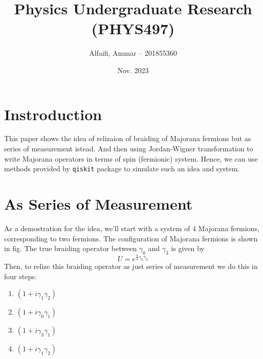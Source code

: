 \documentclass{article}
\title{Physics Undergraduate Research (PHYS497)}
\author{Alfaifi, Ammar -- 201855360}
\date{Nov. 2023}
\def\c#1{\texttt{#1}}
\begin{document}
\maketitle

\section{Instroduction} %
\label{sec:Instroduction}
This paper shows the idea of relizaion of braiding of Majorana fermions but as 
series of measurement istead. And then using Jordan-Wigner transformation to 
write Majorana operators in terms of spin (fermionic) system. Hence, we can use 
methods provided by \c{qiskit} package to simulate such an idea and system.

\section{As Series of Measurement} %
\label{sec:As Series of measurement}
As a demostration for the idea, we'll start with a system of 4 Majorana fermions, 
corresponding to two fermions. The configuration of Majorana fermions is shown in fig. 
The true braiding operator between $\gamma_0$ and $ \gamma_3 $ is given by
\begin{equation}
  U = e^{\frac{\pi}{4} \gamma_0 \gamma_3}
  \label{eq:braiding op}
\end{equation}
Then, to relize this braiding operator as just series of measurement we do this in four steps:
\begin{enumerate}
  \item $ (1 + i \gamma_1 \gamma_2) $
  \item $ (1 + i \gamma_0 \gamma_1) $
  \item $ (1 + i \gamma_3 \gamma_1) $
  \item $ (1 + i \gamma_1 \gamma_2) $
\end{enumerate}
\end{document}
